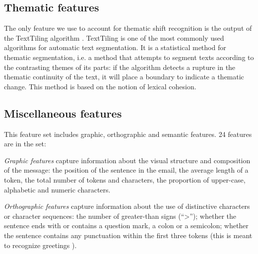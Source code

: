 
\subsection{Thematic features}

The only feature we use to account for thematic shift recognition is the output of the TextTiling algorithm \cite{hearst1997texttiling}. TextTiling is one of the most commonly used algorithms for automatic text segmentation. It is a statistical method for thematic segmentation, i.e. a method that attempts to segment texts according to the contrasting themes of its parts: if the algorithm detects a rupture in the thematic continuity of the text, it will place a boundary to indicate a thematic change. This method is based on the notion of lexical cohesion.

\subsection{Miscellaneous features}

This feature set includes graphic, orthographic and semantic features. 24 features are in the set:

\textit{Graphic features} capture information about the visual structure and composition of the message:
the position of the sentence in the email, 
the average length of a token,
the total number of tokens and characters, 
the proportion of upper-case, alphabetic and numeric characters.


\textit{Orthographic features} capture information about the use of distinctive characters or character sequences:
the number of greater-than signs (``>''); %
whether the sentence ends with or contains a question mark, a colon or a semicolon; %
whether the sentence contains any punctuation within the first three tokens (this is meant to recognize greetings \cite{qadir2011classifying}).

